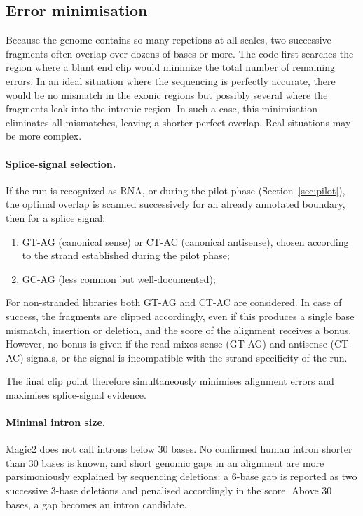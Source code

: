 \documentclass[11pt]{article}
\begin{document}
\subsection{Error minimisation}
\label{sec:error_minimisation}
Because the genome contains so many repetions at all scales,
two successive fragments often overlap over dozens of bases or more.
The code first searches the region where a blunt end clip would
minimize the total number of remaining errors. In an ideal situation
where the sequencing is perfectly accurate, there would be no mismatch
in the exonic regions but possibly several where the fragments
leak into the intronic region. In such a case, this minimisation
eliminates all mismatches, leaving a shorter perfect overlap.
Real situations may be more complex.

\paragraph{Splice-signal selection.}
If the run is recognized as RNA, or during the pilot phase
(Section~\ref{sec:pilot}), the optimal overlap is scanned
successively for an already annotated boundary,
then for a splice signal:
\begin{enumerate}
  \item GT-AG (canonical sense) or CT-AC (canonical antisense),
        chosen according to the strand established during the pilot
        phase;
  \item GC-AG (less common but well-documented);
\end{enumerate}
For non-stranded libraries both GT-AG and CT-AC are considered.
In case of success, the fragments are clipped accordingly, even if this produces
a single base mismatch, insertion or deletion, and the score of the alignment
receives a bonus. However, no bonus is given if the read mixes
sense (GT-AG) and antisense (CT-AC) signals, or the signal is incompatible
with the strand specificity of the run.

The final clip point therefore simultaneously minimises alignment
errors and maximises splice-signal evidence.



\paragraph{Minimal intron size.}
Magic2 does not call introns below 30 bases.
No confirmed human intron shorter than 30 bases is known, and
short genomic gaps in an alignment are more parsimoniously explained
by sequencing deletions: a 6-base gap is reported as two successive
3-base deletions and penalised accordingly in the score.
Above 30 bases, a gap becomes an intron candidate.
\end{document}
